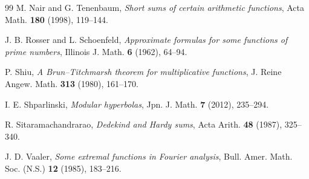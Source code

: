 \begin{thebibliography}{99}
 M. Nair and G. Tenenbaum, \emph{Short sums of certain arithmetic functions}, Acta Math. \textbf{180} (1998), 119--144.

 J. B. Rosser and L. Schoenfeld, \emph{Approximate formulas for some functions of prime numbers}, Illinois J. Math. \textbf{6} (1962), 64--94.

 P. Shiu, \emph{A Brun--Titchmarsh theorem for multiplicative functions}, J. Reine Angew. Math. \textbf{313} (1980), 161--170.

 I. E. Shparlinski, \emph{Modular hyperbolas}, Jpn. J. Math. \textbf{7} (2012), 235--294.

 R. Sitaramachandrarao, \emph{Dedekind and Hardy sums}, Acta Arith. \textbf{48} (1987), 325--340.

 J. D. Vaaler, \emph{Some extremal functions in Fourier analysis}, Bull. Amer. Math. Soc. (N.S.) \textbf{12} (1985), 183--216.

\end{thebibliography}
